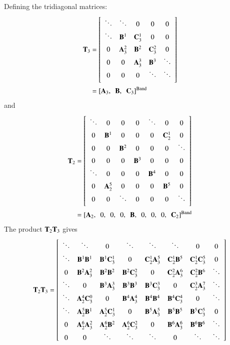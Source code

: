 \documentclass{warpdoc}
\newcommand{\alb}{\vspace{0.2cm}\\} %
\newcommand{\B}{{\bf B}}
\newcommand{\A}{{\bf A}}
\newcommand{\C}{{\bf C}}
\newcommand{\T}{{\bf T}}
\newcommand{\co}{,~~}
\newcommand{\band}{{\rm Band}}
\begin{document}
%
Defining the tridiagonal matrices:
%
%
\begin{align*}
\T_3&=
 \left[
   \begin{array}{cccccc}
     \ddots&\ddots& 0   & 0   & 0           \\
     \ddots& \B^1   & \C_3^1  & 0   & 0           \alb
     0   & \A_3^2 & \B^2    & \C_3^2  & 0           \\
     0   & 0  & \A_3^3  & \B^3    & \ddots          \\
     0   & 0  & 0   & \ddots& \ddots      \alb
   \end{array}
 \right]\alb
 &=\left[ \A_3 \co \B \co \C_3 \right]^\band
\end{align*}
%
and
%
\begin{align*}
\T_2&=
 \left[
   \begin{array}{ccccccccccccc}
     \ddots    & 0  & 0   & 0   & \ddots  & 0   & 0        \alb
     0   & \B^1   & 0  & 0   & 0   & \C_2^1  & 0       \\
     0   & 0  & \B^2    & 0  & 0   & 0   & \ddots      \alb
     0   & 0  & 0  & \B^3    & 0  & 0   & 0       \\
     \ddots  & 0  & 0   & 0  & \B^4    & 0  & 0       \alb
     0   & \A_2^5 & 0   & 0   & 0  & \B^5    & 0      \\
     0   & 0  & \ddots& 0   & 0   & 0  & \ddots        \alb
   \end{array}
 \right]\alb
 &= \left[ \A_2\co 0\co  0\co  0\co  \B\co 0\co  0\co  0\co\C_2 \right]^\band
\end{align*}
%
The product $\T_2 \T_3$ gives
%
\begin{equation}
\T_2 \T_3=
 \left[
   \begin{array}{cccccccccccccc}
     \ddots   & \ddots  & 0     & \ddots     & \ddots   & \ddots   & 0        & 0 \\
     \ddots & \B^1 \B^1    & \B^1 \C_3^1 & 0         & \C_2^1 \A_3^5& \C_2^1 \B^5     & \C_2^1 \C_3^5 & 0 \\
     0     & \B^2 \A_3^2  & \B^2 \B^2   & \B^2 \C_3^2     & 0      & \C_2^2 \A_3^6   & \C_2^2 \B^6  & \ddots  \\
     \ddots  &  0     & \B^3 \A_3^3 & \B^3 \B^3       & \B^3 \C_3^3  & 0         & \C_2^3 \A_3^7 & \ddots \\
     \ddots  & \A_2^4 \C_3^0& 0     & \B^4 \A_3^4     & \B^4 \B^4    & \B^4 \C_3^4     & 0      & \ddots  \\
     \ddots  & \A_2^5 \B^1 & \A_2^5 \C_3^1& 0     & \B^5 \A_3^5     & \B^5 \B^5    & \B^5 \C_3^5     & 0  \\
     0     & \A_2^6 \A_3^2& \A_2^6 \B^2 & \A_2^6 \C_3^2& 0     & \B^6 \A_3^6     & \B^6 \B^6      & \ddots \\
     0     &  0    & \ddots   & \ddots  & \ddots   & 0     & \ddots    & \ddots \\
   \end{array}
 \right]
\end{equation}
\end{document}
